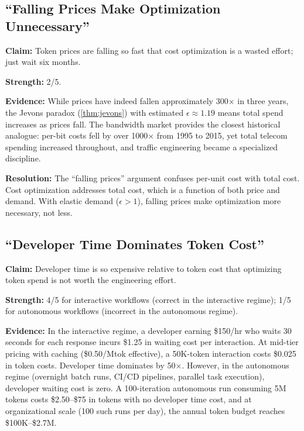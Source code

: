 \documentclass[11pt, a4paper, copyright]{googledeepmind}
\begin{document}
\subsection{``Falling Prices Make Optimization Unnecessary''}

\textbf{Claim:} Token prices are falling so fast that cost optimization is a wasted effort; just wait six months.

\textbf{Strength:} 2/5.

\textbf{Evidence:} While prices have indeed fallen approximately 300$\times$ in three years, the Jevons paradox (\cref{thm:jevons}) with estimated $\epsilon \approx 1.19$ means total spend increases as prices fall. The bandwidth market provides the closest historical analogue: per-bit costs fell by over 1000$\times$ from 1995 to 2015, yet total telecom spending increased throughout, and traffic engineering became a specialized discipline.

\textbf{Resolution:} The ``falling prices'' argument confuses per-unit cost with total cost. Cost optimization addresses total cost, which is a function of both price and demand. With elastic demand ($\epsilon > 1$), falling prices make optimization more necessary, not less.

\subsection{``Developer Time Dominates Token Cost''}

\textbf{Claim:} Developer time is so expensive relative to token cost that optimizing token spend is not worth the engineering effort.

\textbf{Strength:} 4/5 for interactive workflows (correct in the interactive regime); 1/5 for autonomous workflows (incorrect in the autonomous regime).

\textbf{Evidence:} In the interactive regime, a developer earning \$150/hr who waits 30 seconds for each response incurs \$1.25 in waiting cost per interaction. At mid-tier pricing with caching (\$0.50/Mtok effective), a 50K-token interaction costs \$0.025 in token costs. Developer time dominates by 50$\times$. However, in the autonomous regime (overnight batch runs, CI/CD pipelines, parallel task execution), developer waiting cost is zero. A 100-iteration autonomous run consuming 5M tokens costs \$2.50--\$75 in tokens with no developer time cost, and at organizational scale (100 such runs per day), the annual token budget reaches \$100K--\$2.7M.
\end{document}
